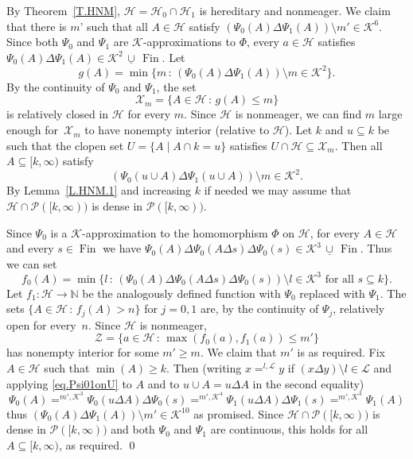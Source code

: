\documentclass{amsart}
\makeatletter
\def\Fin{{\rm Fin}}   %
\def\vert{\,:\,}
\def\text{\mbox}
\theoremstyle{definition}
\theoremstyle{remark}
\newcommand{\ucup}{\,\underline{\cup}\,}
\def\Fin{\operatorname{Fin}}
\newcommand{\cK}{{\mathcal K}}
\renewcommand{\proofname}{Proof}
\renewenvironment{proof}[1][\proofname]{\par
\let\oldqedsymbol\qedsymbol             %
  \normalfont
  \topsep6\p@\@plus6\p@ \trivlist
  \item[\hskip\labelsep\hskip\parindent\scshape
    #1\@addpunct{.}]\ignorespaces
}{%
  \qed\endtrivlist
\global\let\qedsymbol\oldqedsymbol      %
}
\newcommand{\cP}{\mathcal P}
\newcommand{\calL}{\mathcal L}
\newcommand{\bbN}{\mathbb N}
\newcommand{\cX}{\mathcal X}
\newcommand{\cZ}{\mathcal Z}
\newcommand{\calH}{\mathcal H}
\numberwithin{claim}{subsection}
\makeatother
\begin{document}
\begin{proof} By Theorem~\ref{T.HNM}, $\calH=\calH_0\cap \calH_1$ is hereditary and nonmeager.  We claim that there is $m’$ such that all $A\in \calH$ satisfy $(\Psi_0(A)\Delta \Psi_1(A))\setminus m'\in \cK^6$. 
	Since both $\Psi_0$ and $\Psi_1$ are $\cK$-approximations to $\Phi$, every $a\in \calH$ satisfies $\Psi_0(A)\Delta \Psi_1(A)\in \cK^2\ucup \Fin$. Let 
	\[
	g(A)=\min\{m\vert (\Psi_0(A)\Delta \Psi_1(A))\setminus m\in \cK^2\}. 
	\]
	By the continuity of $\Psi_0$ and $\Psi_1$, the set 
	\[
	\cX_m=\{A\in \calH\vert g(A)\leq m\}
	\] 
	is relatively closed in $\calH$ for every $m$. Since $\calH$ is nonmeager, we can find $m$ large enough for~$\cX_m$ to have nonempty interior (relative to $\calH$). Let $k$ and $u\subseteq k$ be such that the clopen set $U=\{A\mid A\cap k=u\}$ satisfies $U\cap \calH\subseteq \cX_m$.  
	Then  all $A\subseteq [k,\infty)$ satisfy 
	\begin{equation}\label{eq.Psi01onU}
	(\Psi_0(u\cup A)\Delta \Psi_1(u\cup A))\setminus m \in \cK^2. 
	\end{equation}
	By Lemma~\ref{L.HNM.1}  and increasing $k$ if needed we may assume that $\calH\cap \cP([k,\infty))$ is dense in $\cP([k,\infty))$. 
	
	
	Since $\Psi_0$ is a $\cK$-approximation to the homomorphism $\Phi$ on $\calH$, for every $A\in \calH$ and every $s\in \Fin$ we have $\Psi_0(A)\Delta \Psi_0(A\Delta s)\Delta\Psi_0(s)\in \cK^3\ucup \Fin$. Thus we can set 
	\[
	f_{0}(A)=\min\{l\vert (\Psi_0(A)\Delta \Psi_0(A\Delta s)\Delta \Psi_0(s))\setminus l\in \cK^3\text{ for all }s\subseteq k\}. 
	\]
	Let $f_{1}\colon \calH\to \bbN$ be the analogously defined  function with $\Psi_0$ replaced with $\Psi_1$.
	The sets $\{A\in\calH\vert f_{j}(A)>n\}$ for $j=0,1$ are, by the continuity of $\Psi_j$, relatively open for every~$n$. 
		Since $\calH$ is nonmeager, 
	\[
	\cZ=\{a\in \calH\vert \max(f_0(a),f_1(a))\leq m'\}
	\]
	has nonempty interior for some 
	$m'\geq m$.   We claim that $m'$ is as required. Fix $A\in \calH$ such that $\min(A)\geq k$. Then (writing $x=^{l,\calL} y$ if $(x\Delta y)\setminus l\in \calL$ and applying \eqref{eq.Psi01onU} to $A$ and to $u\cup A=u\Delta A$ in the second equality)
	\[
	\Psi_0(A)=^{m',\cK^3}\Psi_0(u\Delta A)\Delta \Psi_0(s) =^{m',\cK^4} 
	\Psi_1(u\Delta A)\Delta \Psi_1(s) =^{m',\cK^3}
	\Psi_1(A)
	\]
	thus $(\Psi_0(A)\Delta \Psi_1(A))\setminus m'\in \cK^{10}$ as promised. 
		Since $\calH\cap \cP([k,\infty))$ is dense in $\cP([k,\infty))$ and both $\Psi_0$ and $\Psi_1$ are continuous, this holds for all $A\subseteq [k,\infty)$, as required. 
\end{proof}
\end{document}
